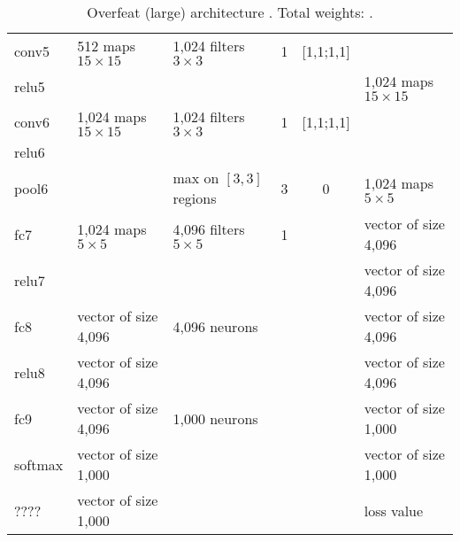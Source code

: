 \begin{table}[h]
\begin{center}
\begin{tabular}{|l||l||l|c|c||l|}
   \hline
   conv5      & 512 maps $15 \times 15$          & 1,024 filters $3 \times 3$              & 1      & [1,1;1,1] &                          \\
   relu5      &                                  &                                         &        &           & 1,024 maps $15 \times 15$\\
   \hline
   conv6      & 1,024 maps $15 \times 15$        & 1,024 filters $3 \times 3$              & 1      & [1,1;1,1] &                          \\
   relu6      &                                  &                                         &        &           &                          \\
   pool6      &                                  & max on $[3,3]$ regions                  & 3      & 0         & 1,024 maps $5 \times 5$  \\
   \hline     
   fc7        & 1,024 maps $5 \times 5$          & 4,096 filters $5 \times 5$              & 1      &           & vector of size 4,096     \\
   relu7      &                                  &                                         &        &           & vector of size 4,096     \\
   \hline
   fc8        & vector of size 4,096             & 4,096 neurons                           &        &           & vector of size 4,096     \\ 
   relu8      & vector of size 4,096             &                                         &        &           & vector of size 4,096     \\
   \hline
   fc9        & vector of size 4,096             & 1,000 neurons                           &        &           & vector of size 1,000     \\
   softmax    & vector of size 1,000             &                                         &        &           & vector of size 1,000     \\
   ????       & vector of size 1,000             &                                         &        &           & loss value               \\
   \hline
 \end{tabular}
 \caption{Overfeat (large) architecture \cite{Sermanet14overfeat}. Total weights: .}
 \label{table:Overfeat}
\end{center}
\end{table} 





